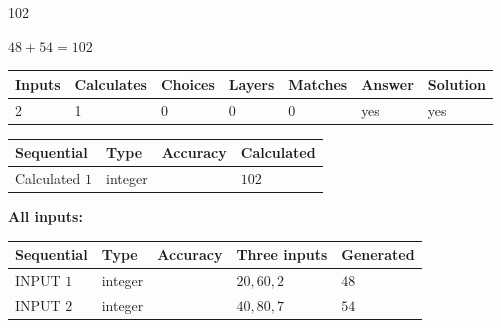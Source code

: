 \documentclass{ctexart}
\begin{document}
 

102
 
 
\noindent{}
 
 

 
 
 
\noindent{}
 
 

$ %
48 +  %
54=   %
102$
 
 
\noindent{}
 
 

 
   
   
   
   
\noindent\begin{tabular}{|l|l|l|l|l|l|l|}
 \hline
Inputs & Calculates & Choices & Layers & Matches & Answer & Solution \\ \hline
 2  & 
 1  & 
 0
  & 
 0  & 
 0  & 
  yes & 
  yes 
  \\ \hline
 \end{tabular}
   
   
   
   
\noindent{}
   
   
  
  
\noindent\begin{tabular}{|l|l|l|l|}
\hline
 Sequential & Type & Accuracy & Calculated \\ 
\hline
 
 
  Calculated $  1 $ & integer &  & 
  $ 102 $ 
 \\  \hline  
 \end{tabular}
   
   
   
   
\noindent\vspace{0.1in}\hspace{-0.08in} {\textbf{\Large{All inputs: }}}
   
   
  
  
\noindent\begin{tabular}{|l|l|l|l|l|}
\hline
 Sequential & Type & Accuracy & Three inputs & Generated \\ 
\hline
 
 
  INPUT $  1 $ & integer &  & $
 20
 , 
 60
 , 
 2
 $ & $ 48 $ 
 \\  \hline  
 
 
  INPUT $  2 $ & integer &  & $
 40
 , 
 80
 , 
 7
 $ & $ 54 $ 
 \\  \hline  
 \end{tabular}
   
\end{document}
